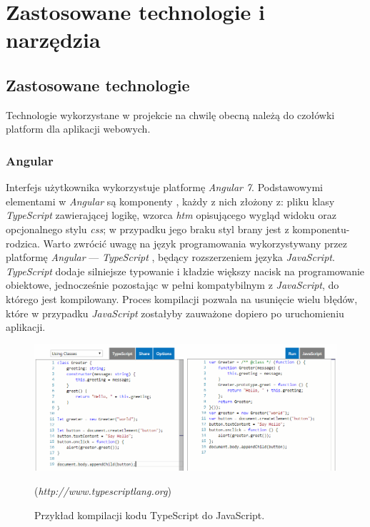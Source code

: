 \documentclass[eng,printmode,openany]{mgr}
\begin{document}
	\newpage
	\chapter{Zastosowane technologie i narzędzia}
	\section{Zastosowane technologie}
	Technologie wykorzystane w projekcie na chwilę obecną należą do czołówki platform dla aplikacji webowych.
	\subsection{Angular}
	Interfejs użytkownika wykorzystuje platformę \textit{Angular 7}. Podstawowymi elementami w \textit{Angular} są komponenty \cite{angular-components}, każdy z nich złożony z: pliku klasy \textit{TypeScript} zawierającej logikę, wzorca \textit{htm} opisującego wygląd widoku oraz opcjonalnego stylu \textit{css}; w przypadku jego braku styl brany jest z komponentu-rodzica. Warto zwrócić uwagę na język programowania wykorzystywany przez platformę \textit{Angular} — \textit{TypeScript} \cite{msdn-ts}, będący rozszerzeniem języka \textit{JavaScript}. \textit{TypeScript} dodaje silniejsze typowanie i kładzie większy nacisk na programowanie obiektowe, jednocześnie pozostając w pełni kompatybilnym z \textit{JavaScript}, do którego jest kompilowany. Proces kompilacji pozwala na usunięcie wielu błędów, które w przypadku \textit{JavaScript} zostałyby zauważone dopiero po uruchomieniu aplikacji.
	\begin{figure}[H]
		\centering
		\includegraphics[width=\textwidth]{images/ts-to-js.png}
		\caption{Przykład kompilacji kodu TypeScript do JavaScript.}
		\small
		(\textit{http://www.typescriptlang.org})
	\end{figure}
\end{document}
